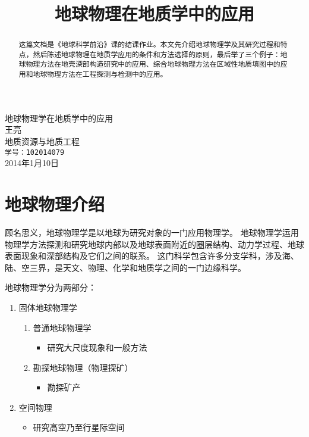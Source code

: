 \documentclass[hyperref,UTF-8]{ctexart}
\title{\heiti 地球物理在地质学中的应用}
\author{\kaishu}
\date{}
\begin{document}
\begin{titlepage}
\vspace*{40mm}
\begin{center}
{\heiti\Huge 地球物理学在地质学中的应用}\\[30mm]
{\Large 王亮}\\[5mm]
地质资源与地质工程\\\texttt{学号：102014079}\\[80mm]
2014年1月10日
\end{center}
\end{titlepage}
\maketitle
\tableofcontents
\begin{abstract}
这篇文档是《地球科学前沿》课的结课作业。本文先介绍地球物理学及其研究过程和特点，然后陈述地球物理在地质学应用的条件和方法选择的原则，最后举了三个例子：地球物理方法在地壳深部构造研究中的应用、综合地球物理方法在区域性地质填图中的应用和地球物理方法在工程探测与检测中的应用。
\end{abstract}
\section{地球物理介绍}
顾名思义，地球物理学是以地球为研究对象的一门应用物理学。
地球物理学运用物理学方法探测和研究地球内部以及地球表面附近的圈层结构、动力学过程、地球表面现象和深部结构及它们之间的联系。
这门科学包含许多分支学科，涉及海、陆、空三界，是天文、物理、化学和地质学之间的一门边缘科学。

地球物理学分为两部分：

\begin{enumerate}
\item 固体地球物理学
\begin{enumerate}
\item 普通地球物理学
\begin{itemize}
\itemsep=0pt \parskip=0pt
\item 研究大尺度现象和一般方法
\end{itemize}
\item 勘探地球物理（物理探矿）
\begin{itemize}
\itemsep=0pt \parskip=0pt
\item 勘探矿产
\end{itemize}
\end{enumerate}
\item 空间物理
\begin{itemize}
\item 研究高空乃至行星际空间
\end{itemize}
\end{enumerate}
\end{document}
